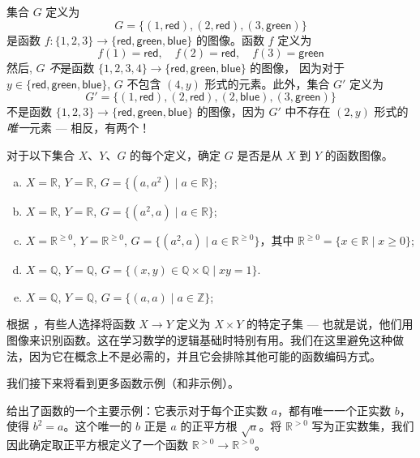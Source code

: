 \begin{example}
集合 $G$ 定义为
\[ G = \{ (1, \mathsf{red}), (2, \mathsf{red}), (3, \mathsf{green}) \} \]
是函数 $f : \{ 1, 2, 3 \} \to \{ \mathsf{red}, \mathsf{green}, \mathsf{blue} \}$ 的图像。函数 $f$ 定义为
\[ f(1) = \mathsf{red}, \quad f(2) = \mathsf{red}, \quad f(3) = \mathsf{green} \]
然后, $G$ \textit{不}是函数 $\{ 1, 2, 3, 4 \} \to \{ \mathsf{red}, \mathsf{green}, \mathsf{blue} \}$ 的图像， 因为对于$y \in \{ \mathsf{red}, \mathsf{green}, \mathsf{blue} \}$, $G$ 不包含 $(4,y)$ 形式的元素。此外，集合 $G'$ 定义为
\[ G' = \{ (1, \mathsf{red}), (2, \mathsf{red}), (2, \mathsf{blue}), (3, \mathsf{green}) \} \]
不是函数 $\{ 1, 2, 3 \} \to \{ \mathsf{red}, \mathsf{green}, \mathsf{blue} \}$ 的图像，因为 $G'$ 中不存在 $(2,y)$ 形式的\textit{唯一}元素 --- 相反，有两个！
\end{example}

\begin{exercise}
对于以下集合 $X$、$Y$、$G$ 的每个定义，确定 $G$ 是否是从 $X$ 到 $Y$ 的函数图像。
\begin{enumerate}[(a)]
\item $X = \mathbb{R}$, $Y = \mathbb{R}$, $G = \{ (a, a^2) \mid a \in \mathbb{R} \}$;
\item $X = \mathbb{R}$, $Y = \mathbb{R}$, $G = \{ (a^2, a) \mid a \in \mathbb{R} \}$;
\item $X = \mathbb{R}^{\ge 0}$, $Y = \mathbb{R}^{\ge 0}$, $G = \{ (a^2, a) \mid a \in \mathbb{R}^{\ge 0} \}$，其中 $\mathbb{R}^{\ge 0} = \{ x \in \mathbb{R} \mid x \ge 0 \}$;
\item $X = \mathbb{Q}$, $Y = \mathbb{Q}$, $G = \{ (x, y) \in \mathbb{Q} \times \mathbb{Q} \mid xy = 1 \}$.
\item $X = \mathbb{Q}$, $Y = \mathbb{Q}$, $G = \{ (a, a) \mid a \in \mathbb{Z} \}$;
\end{enumerate}
\end{exercise}

\begin{aside}
根据 ，有些人选择将函数 $X \to Y$ 定义为 $X \times Y$ 的特定子集 --- 也就是说，他们用图像来识别函数。这在学习数学的逻辑基础时特别有用。我们在这里避免这种做法，因为它在概念上不是必需的，并且它会排除其他可能的函数编码方式。
\end{aside}

我们接下来将看到更多函数示例（和非示例）。

\begin{example} \label{exFirstExamplesOfFunctions}
 给出了函数的一个主要示例：它表示对于每个正实数 $a$，都有唯一一个正实数 $b$，使得 $b^2=a$。这个唯一的 $b$ 正是 $a$ 的正平方根 $\sqrt{a}$。将 $\mathbb{R}^{>0}$ 写为正实数集，我们因此确定取正平方根定义了一个函数 $\mathbb{R}^{>0} \to \mathbb{R}^{>0}$。
\end{example}

